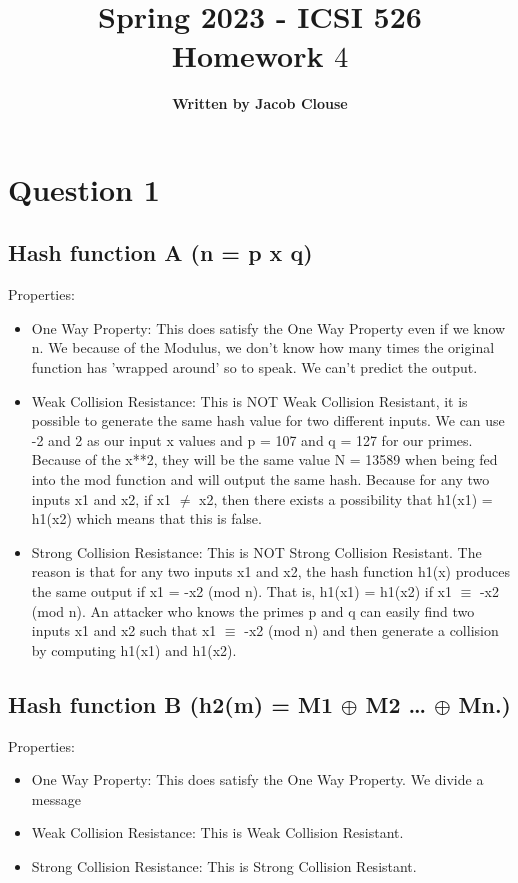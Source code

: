 \documentclass[10pt]{article}
\author{\vspace{0.2in}\textbf{Written by Jacob Clouse}}
\title{Spring 2023 - ICSI 526\\Homework $4$}
\begin{document}
\maketitle
\tableofcontents
\vspace{0.2in}

\section{Question 1}
\subsection{Hash function A (n = p x q)}
\noindent Properties: 
\begin{itemize}
	\item One Way Property: This does satisfy the One Way Property even if we know n. We because of the Modulus, we don't know how many times the original function has 'wrapped around' so to speak. We can't predict the output.
	
	
	\item Weak Collision Resistance: This is NOT Weak Collision Resistant, it is possible to generate the same hash value for two different inputs. We can use -2 and 2 as our input x values and p = 107 and q = 127 for our primes.
	Because of the x**2, they will be the same value N = 13589 when being fed into the mod function and will output the same hash. 
	Because for any two inputs x1 and x2, if x1 $\neq$ x2, then there exists a possibility that h1(x1) = h1(x2) which means that this is false.
	
	
	\item Strong Collision Resistance: This is NOT Strong Collision Resistant. The reason is that for any two inputs x1 and x2, the hash function h1(x) produces the same output if x1 = -x2 (mod n). That is, h1(x1) = h1(x2) if x1 $\equiv$ -x2 (mod n). 
	An attacker who knows the primes p and q can easily find two inputs x1 and x2 such that x1 $\equiv$ -x2 (mod n) and then generate a collision by computing h1(x1) and h1(x2). 
	
\end{itemize}

\vspace{0.2in}
\subsection{Hash function B (h2(m) = M1 $\oplus$ M2 … $\oplus$ Mn.)}
\noindent Properties:
\begin{itemize}
	\item One Way Property: This does satisfy the One Way Property. We divide a message  
	
	
	\item Weak Collision Resistance: This is Weak Collision Resistant.
	
	
	\item Strong Collision Resistance: This is Strong Collision Resistant. 
\end{itemize}
\end{document}
